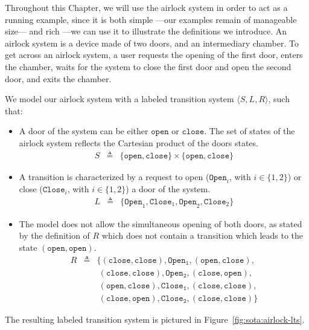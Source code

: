 Throughout this Chapter, we will use the airlock system in order to act as a
running example, since it is both simple ---our examples remain of manageable
size--- and rich ---we can use it to illustrate the definitions we introduce.
%
An airlock system is a device made of two doors, and an intermediary chamber.
%
To get across an airlock system, a user requests the opening of the first door,
enters the chamber, waits for the system to close the first door and open the
second door, and exits the chamber.

\begin{example}
  \label{example:sota:airlocklts}

  We model our airlock system with a labeled transition system
  \( \langle S, L, R \rangle \), such that:

  \begin{itemize}
  \item A door of the system can be either \( \mathtt{open} \) or
    \( \mathtt{close} \).
    The set of states of the airlock system reflects the Cartesian product of
    the doors states.
    \[
      \begin{array}{rcl}
        S & \triangleq & \{ \mathtt{open}, \mathtt{close} \} \times \{ \mathtt{open},
                         \mathtt{close} \}
      \end{array}
    \]
  \item A transition is characterized by a request to open
    (\( \mathtt{Open}_i\), with \( i \in \{1, 2\} \)) or close
    (\( \mathtt{Close}_i \), with \( i \in \{1, 2\} \)) a door of the system.
    \[
      \begin{array}{rcl}
        L & \triangleq & \{ \mathtt{Open}_1, \mathtt{Close}_1, \mathtt{Open}_2,
                         \mathtt{Close}_2 \}
      \end{array}
    \]
  \item The model does not allow the simultaneous opening of both doors, as
    stated by the definition of \( R \) which does not contain a transition
    which leads to the state \( (\mathtt{open}, \mathtt{open}) \).
    \[
      \begin{array}{rcl}
        R & \triangleq & \{ (\mathtt{close}, \mathtt{close}), \mathtt{Open_1},
                         (\mathtt{open}, \mathtt{close}), \\
          & & \ (\mathtt{close}, \mathtt{close}), \mathtt{Open_2},
              (\mathtt{close}, \mathtt{open}), \\
          & & \ (\mathtt{open}, \mathtt{close}), \mathtt{Close_1},
              (\mathtt{close}, \mathtt{close}), \\
          & & \ (\mathtt{close}, \mathtt{open}), \mathtt{Close_2},
              (\mathtt{close}, \mathtt{close}) \}
      \end{array}
    \]
  \end{itemize}

  The resulting labeled transition system is pictured in
  Figure~\ref{fig:sota:airlock-lts}.
\end{example}


